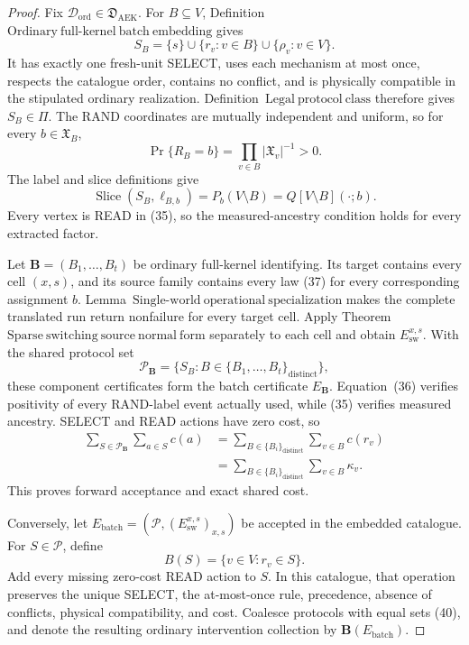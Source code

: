 \documentclass{article}
\begin{document}
\begin{proof}
Fix \(\mathcal D_{\mathrm{ord}}\in\mathfrak D_{\mathrm{AEK}}\).  For \(B\subseteq V\), Definition~\(\mathrm{Ordinary\ full\mbox{-}kernel\ batch\ embedding}\) gives
\[
 S_B=\{s\}\cup\{r_v:v\in B\}\cup\{\rho_v:v\in V\}.
 \tag{35}
\]
It has exactly one fresh-unit SELECT, uses each mechanism at most once, respects the catalogue order, contains no conflict, and is physically compatible in the stipulated ordinary realization.  Definition~\(\mathrm{Legal\ protocol\ class}\) therefore gives \(S_B\in\Pi\).  The RAND coordinates are mutually independent and uniform, so for every \(b\in\mathfrak X_B\),
\[
 \Pr\{R_B=b\}=\prod_{v\in B}|\mathfrak X_v|^{-1}>0.
 \tag{36}
\]
The label and slice definitions give
\[
 \operatorname{Slice}(S_B,\ell_{B,b})
 =P_b(V\setminus B)=Q[V\setminus B](\cdot;b).
 \tag{37}
\]
Every vertex is READ in (35), so the measured-ancestry condition holds for every extracted factor.

Let \(\mathbf B=(B_1,\ldots,B_t)\) be ordinary full-kernel identifying.  Its target contains every cell \((x,s)\), and its source family contains every law (37) for every corresponding assignment \(b\).  Lemma~\(\mathrm{Single\mbox{-}world\ operational\ specialization}\) makes the complete translated run return nonfailure for every target cell.  Apply Theorem~\(\mathrm{Sparse\ switching\ source\ normal\ form}\) separately to each cell and obtain \(E_{\mathrm{sw}}^{x,s}\).  With the shared protocol set
\[
 \mathcal P_{\mathbf B}
 =\{S_B:B\in\{B_1,\ldots,B_t\}_{\mathrm{distinct}}\},
 \tag{38}
\]
these component certificates form the batch certificate \(E_{\mathbf B}\).  Equation~(36) verifies positivity of every RAND-label event actually used, while (35) verifies measured ancestry.  SELECT and READ actions have zero cost, so
\[
\begin{aligned}
 \sum_{S\in\mathcal P_{\mathbf B}}\sum_{a\in S}c(a)
 &=\sum_{B\in\{B_i\}_{\mathrm{distinct}}}\sum_{v\in B}c(r_v)\\
 &=\sum_{B\in\{B_i\}_{\mathrm{distinct}}}\sum_{v\in B}\kappa_v.
\end{aligned}
\tag{39}
\]
This proves forward acceptance and exact shared cost.

Conversely, let
\(E_{\mathrm{batch}}=(\mathcal P,(E_{\mathrm{sw}}^{x,s})_{x,s})\)
be accepted in the embedded catalogue.  For \(S\in\mathcal P\), define
\[
 B(S)=\{v\in V:r_v\in S\}.
 \tag{40}
\]
Add every missing zero-cost READ action to \(S\).  In this catalogue, that operation preserves the unique SELECT, the at-most-once rule, precedence, absence of conflicts, physical compatibility, and cost.  Coalesce protocols with equal sets (40), and denote the resulting ordinary intervention collection by \(\mathbf B(E_{\mathrm{batch}})\).


\end{proof}
\end{document}
